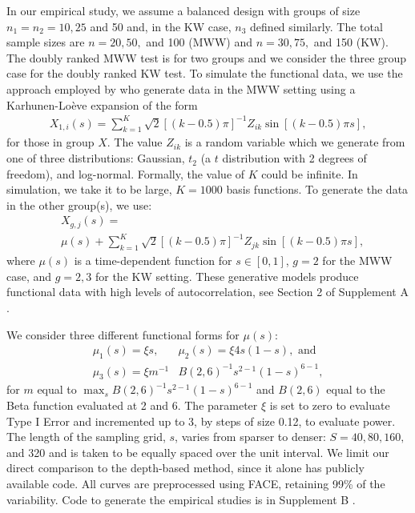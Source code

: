 \documentclass[12pt]{article}
\theoremstyle{plain}
\begin{document}
	In our empirical study, we assume a balanced design with groups of size $n_1 = n_2 = 10, 25$ and 50 and, in the KW case, $n_3$ defined similarly. The total sample sizes are $n = 20, 50,$ and 100 (MWW) and $n = 30, 75,$ and 150 (KW). The doubly ranked MWW test is for two groups and we consider the three group case for the doubly ranked KW test. To simulate the functional data, we use the approach employed by \cite{Chak2015} who generate data in the MWW setting using a Karhunen-Lo\`eve expansion of the form
	\begin{align*}
		X_{1,i}(s) = \sum_{k=1}^K \sqrt{2} \left[(k - 0.5)\pi \right]^{-1} Z_{ik} \sin\left[(k - 0.5)\pi s\right],
	\end{align*}
	for those in group $X$. The value $Z_{ik}$ is a random variable which we generate from one of three distributions: Gaussian, $t_2$ (a $t$ distribution with 2 degrees of freedom), and log-normal. Formally, the value of $K$ could be infinite. In simulation, we take it to be large, $K = 1000$ basis functions. To generate the data in the other group(s), we use:
	\begin{align*}
		&X_{g,j}(s) = \\
		&\mu(s) + \sum_{k=1}^K \sqrt{2} \left[(k - 0.5)\pi \right]^{-1} Z_{jk} \sin\left[(k - 0.5)\pi s\right],
	\end{align*}
	where $\mu(s)$ is a time-dependent function for $s \in [0,1]$, $g = 2$ for the MWW case, and $g = 2, 3$ for the KW setting. These generative models produce functional data with high levels of autocorrelation, see Section 2 of Supplement A \citep{DRTSup2024A}.
	
	We consider three different functional forms for $\mu(s)$: 
	\begin{align*}
		\mu_1(s) = \xi s,\ &\mu_2(s) = \xi4s(1-s), \text{ and}\\
		\mu_3(s) = \xi m^{-1} &B(2, 6)^{-1} s^{2-1} (1-s)^{6-1},
	\end{align*}
	for $m$ equal to $\max_s B(2, 6)^{-1} s^{2-1}(1-s)^{6-1}$ and $B(2,6)$ equal to the Beta function evaluated at 2 and 6. The parameter $\xi$ is set to zero to evaluate Type I Error and incremented up to 3, by steps of size 0.12, to evaluate power. The length of the sampling grid, $s$, varies from sparser to denser: $S = 40, 80, 160,$ and 320 and is taken to be equally spaced over the unit interval. We limit our direct comparison to the depth-based method, since it alone has publicly available code. All curves are preprocessed using FACE, retaining 99\% of the variability. Code to generate the empirical studies is in Supplement B \citep{DRTSup2024B}.
\end{document}
